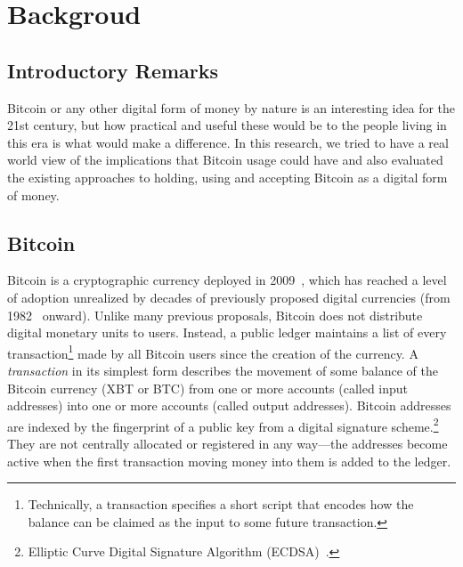 

\chapter{Backgroud}

\section{Introductory Remarks}

Bitcoin or any other digital form of money by nature is an interesting idea for the 21st century, but how practical and useful these would be to the people living in this era is what would make a difference. 
In this research, we tried to have a real world view of the implications that Bitcoin usage could have and also evaluated the existing approaches to holding, using and accepting Bitcoin as a digital form of money.





\section{Bitcoin}
Bitcoin is a cryptographic currency deployed in 2009~\cite{Nak08}, which has reached a level of adoption unrealized by decades of previously proposed digital currencies (from 1982~\cite{Cha82} onward). Unlike many previous proposals, Bitcoin does not distribute digital monetary units to users. Instead, a public ledger maintains a list of every transaction\footnote{Technically, a transaction specifies a short script that encodes how the balance can be claimed as the input to some future transaction.} made by all Bitcoin users since the creation of the currency. A \textit{transaction} in its simplest form describes the movement of some balance of the Bitcoin currency (XBT or BTC) from one or more accounts (called input addresses) into one or more accounts (called output addresses). Bitcoin addresses are indexed by the fingerprint of a public key from a digital signature scheme.\footnote{Elliptic Curve Digital Signature Algorithm (ECDSA)~\cite{ecdsa}.} They are not centrally allocated or registered in any way---the addresses become active when the first transaction moving money into them is added to the ledger. 

